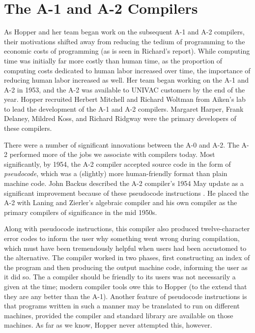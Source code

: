 \section{The A-1 and A-2 Compilers}

As Hopper and her team began work on the subsequent A-1 and A-2 compilers,
their motivations shifted away from reducing the tedium of programming to the
economic costs of programming (as is seen in Richard's report).
While computing time was initially far more
costly than human time, as the proportion of computing costs dedicated to human
labor increased over time, the importance of reducing human labor increased as
well.
Her team began working on the A-1 and A-2 in 1953, and the A-2 was
available to UNIVAC customers by the end of the year.
Hopper recruited Herbert Mitchell and Richard Woltman from Aiken's
lab to lead the development of the A-1 and A-2 compilers.
Margaret Harper, Frank Delaney, Mildred Koss, and Richard Ridgway were
the primary developers of these compilers.

There were a number of significant innovations between the A-0 and A-2.
The A-2 performed more of the jobs we associate with compilers today.
Most significantly, by 1954, the A-2 compiler accepted source code
in the form of \textit{pseudocode}, which was a (slightly) more human-friendly
format than plain machine code.
John Backus described the A-2 compiler's 1954 May update as a significant
improvement because of these pseudocode instructions
\cite{hopl_backus_history_of_fortran}.
He placed the A-2 with Laning and Zierler's algebraic compiler and
his own \FTNI{} compiler as the primary compilers of significance in the
mid 1950s.

Along with pseudocode instructions, this compiler also produced
twelve-character error codes to inform the user why something went wrong
during compilation, which must have been tremendously helpful when users
had been accustomed to the alternative.
The compiler worked in two phases, first constructing an index of the
program and then producing the output machine code, informing the user as
it did so.
The a compiler should be friendly to its users was not necessarily a given at
the time; modern compiler tools owe this to Hopper (to the extend that they
are any better than the A-1).
Another feature of pseudocode instructions is that programs written 
in such a manner may be translated to run on different machines, provided
the compiler and standard library are available on those machines.
As far as we know, Hopper never attempted this, however.

